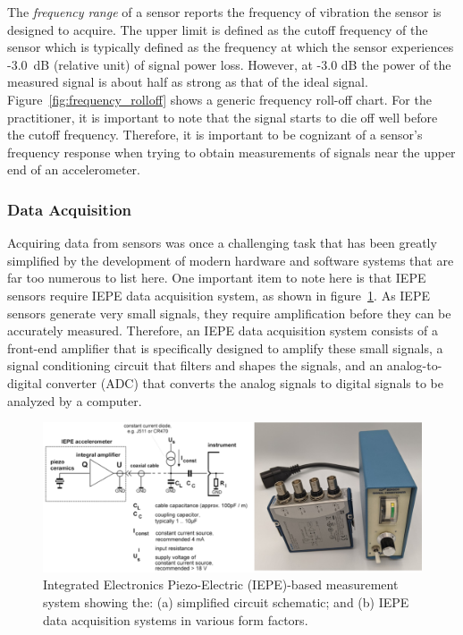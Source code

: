 \documentclass[12pt,letter]{article}
\begin{document}
The \emph{frequency range} of a sensor reports the frequency of vibration the sensor is designed to acquire. The upper limit is defined as the cutoff frequency of the sensor which is typically defined as the frequency at which the sensor experiences -3.0~dB (relative unit) of signal power loss. However, at -3.0 dB the power of the measured signal is about half as strong as that of the ideal signal. Figure~\ref{fig:frequency_rolloff} shows a generic frequency roll-off chart. For the practitioner, it is important to note that the signal starts to die off well before the cutoff frequency. Therefore, it is important to be cognizant of a sensor's frequency response when trying to obtain measurements of signals near the upper end of an accelerometer. 





\subsubsection{Data Acquisition}

Acquiring data from sensors was once a challenging task that has been greatly simplified by the development of modern hardware and software systems that are far too numerous to list here. One important item to note here is that IEPE sensors require IEPE data acquisition system, as shown in figure~\ref{fig:IEPE}.  As IEPE sensors generate very small signals, they require amplification before they can be accurately measured. Therefore, an IEPE data acquisition system consists of a front-end amplifier that is specifically designed to amplify these small signals, a signal conditioning circuit that filters and shapes the signals, and an analog-to-digital converter (ADC) that converts the analog signals to digital signals to be analyzed by a computer.

\begin{figure}[H]
    \centering
    \includegraphics[width=6.5in]{../figures/IEPE.png}
    \caption{Integrated Electronics Piezo-Electric (IEPE)-based measurement system showing the: (a) simplified circuit schematic\protect\footnotemark[1]; and (b) IEPE data acquisition systems in various form factors.}
    \label{fig:IEPE}
\end{figure} 
\end{document}
